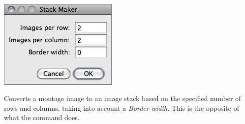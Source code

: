 \paragraph{\protect{}\label{par:Montage-to-Stack...}}

\begin{minipage}[c][1\totalheight][t]{0.32\columnwidth}%
\includegraphics[scale=0.55]{images/StackMaker}%
\end{minipage}%
\begin{minipage}[c][1\totalheight][t]{0.68\columnwidth}%
Converts a montage image to an image stack based on the specified
number of rows and columns, taking into account a \emph{Border width}.
This is the opposite of what the 
command does.


%
\end{minipage}


\paragraph[\protect\userinterface{Make Substack\ldots{}}]{\protect{}\label{par:Make-Substack}\improvement{}}

